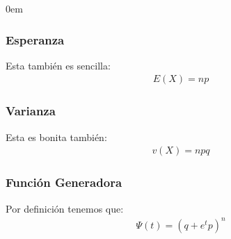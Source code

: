 \documentclass[12pt, fleqn]{report}                             %
\newenvironment{SmallIndentation}[1][0.75em]                    %
        {\begin{adjustwidth}{#1}{}\begin{footnotesize}}             %
        {\end{footnotesize}\end{adjustwidth}}                       %
\theoremstyle{break}                                            %
\newcommand{\Wrap}[1]{\left( #1 \right)}                        %
\begin{document}
\begin{multicols}{2}
\begin{SmallIndentation}[0em]
                    \subsubsection{Esperanza}  

                        Esta también es sencilla:
                        \begin{align*}
                            E(X) = np
                        \end{align*}


                    \subsubsection{Varianza}

                        Esta es bonita también:
                        \begin{align*}
                            v(X) = npq   
                        \end{align*}

                    \subsubsection{Función Generadora}  

                        Por definición tenemos que:
                        \begin{align*}
                            \Psi (t) = \Wrap{q + e^tp}^n   
                        \end{align*}


\end{SmallIndentation}
\end{multicols}
\end{document}
